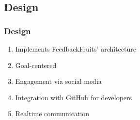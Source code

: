\subsection{Design}
\begin{frame}\frametitle{Design}
	\begin{enumerate}
	    \item Implements FeedbackFruits' architecture
	    \item Goal-centered
	    \item Engagement via social media
	    \item Integration with GitHub for developers
	    \item Realtime communication
	\end{enumerate}
	
\end{frame}
